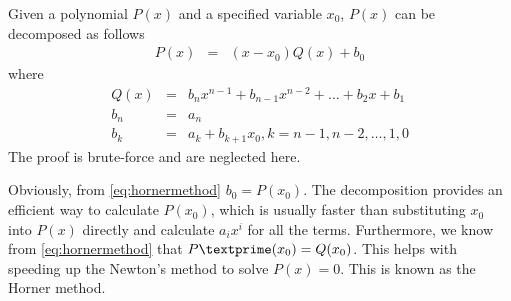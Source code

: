 Given a polynomial $P(x)$ and a specified variable $x_0$, $P(x)$ can be decomposed as follows
\begin{eqnarray}
P(x) &=& (x-x_0)Q(x) + b_0 \label{eq:hornermethod}
\end{eqnarray}
where
\begin{eqnarray}
  Q(x) &=& b_nx^{n-1} + b_{n-1}x^{n-2} + \ldots + b_2x + b_1 \nonumber \\
  b_n &=& a_n \nonumber \\
  b_k &=& a_k + b_{k+1}x_0, k=n-1, n-2, \ldots, 1, 0 \nonumber
\end{eqnarray}
The proof is brute-force and are neglected here.

Obviously, from \eqref{eq:hornermethod} $b_0 = P(x_0)$. The decomposition provides an efficient way to calculate $P(x_0)$, which is usually faster than substituting $x_0$ into $P(x)$ directly and calculate $a_ix^i$ for all the terms. Furthermore, we know from \eqref{eq:hornermethod} that $P\textprime(x_0)=Q(x_0)$. This helps with speeding up the Newton's method to solve $P(x)=0$. This is known as the Horner method.



